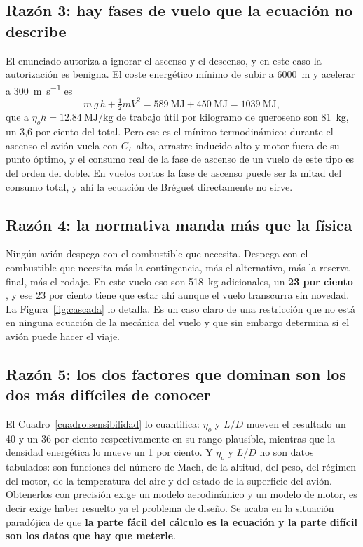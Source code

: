 \documentclass[11pt,letterpaper]{article}
\begin{document}
\subsection{Razón 3: hay fases de vuelo que la ecuación no describe}

El enunciado autoriza a ignorar el ascenso y el descenso, y en este caso la
autorización es benigna. El coste energético mínimo de subir a
\SI{6000}{\meter} y acelerar a \SI{300}{\meter\per\second} es
\begin{equation}
m\,g\,h + \tfrac{1}{2}m V^{2}
 = \SI{589}{\mega\joule} + \SI{450}{\mega\joule} = \SI{1039}{\mega\joule},
\end{equation}
que a \(\eta_o h = \SI{12.84}{\mega\joule\per\kilogram}\) de trabajo útil por
kilogramo de queroseno son \SI{81}{\kilogram}, un 3,6 por ciento del total.
Pero ese es el mínimo termodinámico: durante el ascenso el avión vuela con
\(C_L\) alto, arrastre inducido alto y motor fuera de su punto óptimo, y el
consumo real de la fase de ascenso de un vuelo de este tipo es del orden del
doble. En vuelos cortos la fase de ascenso puede ser la mitad del consumo total,
y ahí la ecuación de Bréguet directamente no sirve.

\subsection{Razón 4: la normativa manda más que la física}

Ningún avión despega con el combustible que necesita. Despega con el
combustible que necesita más la contingencia, más el alternativo, más la
reserva final, más el rodaje. En este vuelo eso son \SI{518}{\kilogram}
adicionales, un \textbf{23 por ciento} \parencite{easa965}, y ese 23 por ciento
tiene que estar ahí aunque el vuelo transcurra sin novedad. La
Figura~\ref{fig:cascada} lo detalla. Es un caso claro de una restricción que no
está en ninguna ecuación de la mecánica del vuelo y que sin embargo determina si
el avión puede hacer el viaje.

\subsection{Razón 5: los dos factores que dominan son los dos más difíciles de
conocer}

El Cuadro~\ref{cuadro:sensibilidad} lo cuantifica: \(\eta_o\) y \(L/D\) mueven
el resultado un 40 y un 36 por ciento respectivamente en su rango plausible,
mientras que la densidad energética lo mueve un 1 por ciento. Y \(\eta_o\) y
\(L/D\) no son datos tabulados: son funciones del número de Mach, de la
altitud, del peso, del régimen del motor, de la temperatura del aire y del
estado de la superficie del avión. Obtenerlos con precisión exige un modelo
aerodinámico y un modelo de motor, es decir exige haber resuelto ya el problema
de diseño. Se acaba en la situación paradójica de que \textbf{la parte fácil del
cálculo es la ecuación y la parte difícil son los datos que hay que meterle}.
\end{document}

